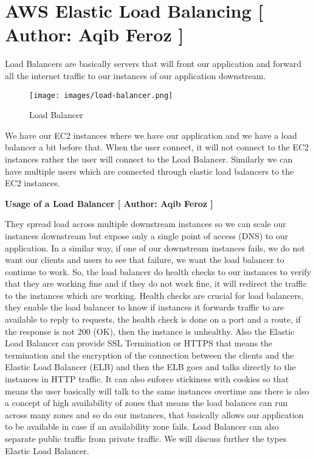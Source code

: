 \section{AWS Elastic Load Balancing [ Author: Aqib Feroz ]}

Load Balancers are basically servers that will front our application and forward all the internet traffic to our instances of our application downstream. 
\begin{figure}[h]
    \centering
    \texttt{[image: images/load-balancer.png]}
    \caption{Load Balancer}
    \label{fig:my_label}
\end{figure}

We have our EC2 instances where we have our application and we have a load balancer a bit before that. When the user connect, it will not connect to the EC2 instances rather the user will connect to the Load Balancer. Similarly we can have multiple users which are connected through elastic load balancers to the EC2 instances.

\textbf{Usage of a Load Balancer [ Author: Aqib Feroz ]}

They spread load across multiple downstream instances so we can scale our instances downstream but expose only a single point of access (DNS) to our application. In a similar way, if one of our downstream instances fails, we do not want our clients and users to see that failure, we want the load balancer to continue to work. So, the load balancer do health checks to our instances to verify that they are working fine and if they do not work fine, it will redirect the traffic to the instances which are working. Health checks are crucial for load balancers, they enable the load balancer to know if instances it forwards traffic to are available to reply to requests, the health check is done on a port and a route, if the response is not 200 (OK), then the instance is unhealthy. Also the Elastic Load Balancer can provide SSL Termination or HTTPS that means the termination and the encryption of the connection between the clients and the Elastic Load Balancer (ELB) and then the ELB goes and talks directly to the instances in HTTP traffic. It can also enforce stickiness with cookies so that means the user basically will talk to the same instances overtime ans there is also a concept of high availability of zones that means the load balances can run across many zones and so do our instances, that basically allows our application to be available in case if an availability zone fails. Load Balancer can also separate public traffic from private traffic. We will discuss further the types Elastic Load Balancer.

